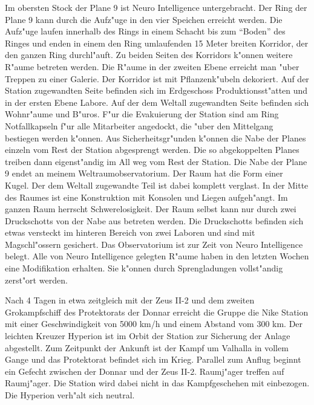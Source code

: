 Im obersten Stock der Plane 9 ist Neuro Intelligence untergebracht. Der Ring der Plane 9 kann durch die Aufz"uge in den vier Speichen erreicht werden. Die Aufz"uge laufen innerhalb des Rings in einem Schacht bis zum "`Boden"' des Ringes und enden in einem den Ring umlaufenden 15 Meter breiten Korridor, der den ganzen Ring durchl"auft. Zu beiden Seiten des Korridors k"onnen weitere R"aume betreten werden. Die R"aume in der zweiten Ebene erreicht man "uber Treppen zu einer Galerie. Der Korridor ist mit Pflanzenk"ubeln dekoriert. Auf der Station zugewandten Seite befinden sich im Erdgeschoss Produktionsst"atten und in der ersten Ebene Labore. Auf der dem Weltall zugewandten Seite befinden sich Wohnr"aume und B"uros. F"ur die Evakuierung der Station sind am Ring Notfallkapseln f"ur alle Mitarbeiter angedockt, die "uber den Mittelgang bestiegen werden k"onnen. Aus Sicherheitsgr"unden k"onnen die Nabe der Planes einzeln vom Rest der Station abgesprengt werden. Die so abgekoppelten Planes treiben dann eigenst"andig im All weg vom Rest der Station. Die Nabe der Plane 9 endet an meinem Weltraumobservatorium. Der Raum hat die Form einer Kugel. Der dem Weltall zugewandte Teil ist dabei komplett verglast. In der Mitte des Raumes ist eine Konstruktion mit Konsolen und Liegen aufgeh"angt. Im ganzen Raum herrscht Schwerelosigkeit. Der Raum selbst kann nur durch zwei Druckschotts von der Nabe aus betreten werden. Die Druckschotts befinden sich etwas versteckt im hinteren Bereich von zwei Laboren und sind mit Magschl"ossern gesichert. Das Observatorium ist zur Zeit von Neuro Intelligence belegt. Alle von Neuro Intelligence gelegten R"aume haben in den letzten Wochen eine Modifikation erhalten. Sie k"onnen durch Sprengladungen vollst"andig zerst"ort werden.



Nach 4 Tagen in etwa zeitgleich mit der Zeus II-2 und dem zweiten Gro\3kampfschiff des Protektorats der Donnar erreicht die Gruppe die Nike Station mit einer Geschwindigkeit von 5000 km/h und einem Abstand vom 300 km. Der leichten Kreuzer Hyperion ist im Orbit der Station zur Sicherung der Anlage abgestellt. Zum Zeitpunkt der Ankunft ist der Kampf um Valhalla in vollem Gange und das Protektorat befindet sich im Krieg. Parallel zum Anflug beginnt ein Gefecht zwischen der Donnar und der Zeus II-2. Raumj"ager treffen auf Raumj"ager. Die Station wird dabei nicht in das Kampfgeschehen mit einbezogen. Die Hyperion verh"alt sich neutral.

